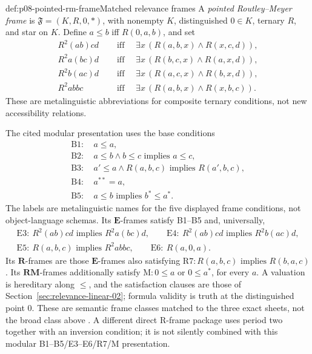 \begin{hbdefinition}{def:p08-pointed-rm-frame}{Matched relevance frames}
A \emph{pointed Routley--Meyer frame} is
\(\mathfrak F=(K,R,0,{*})\), with nonempty \(K\), distinguished
\(0\in K\), ternary \(R\), and star on \(K\).  Define
\(a\leq b\) iff \(R(0,a,b)\), and set
\[
\begin{aligned}
 R^2(ab)cd &\quad\text{ iff }\quad
   \exists x\,(R(a,b,x)\land R(x,c,d)),\\
 R^2a(bc)d &\quad\text{ iff }\quad
   \exists x\,(R(b,c,x)\land R(a,x,d)),\\
 R^2b(ac)d &\quad\text{ iff }\quad
   \exists x\,(R(a,c,x)\land R(b,x,d)),\\
 R^2abbc &\quad\text{ iff }\quad
   \exists x\,(R(a,b,x)\land R(x,b,c)).
\end{aligned}
\]
These are metalinguistic abbreviations for composite ternary conditions, not
new accessibility relations.

The cited modular presentation uses the base conditions
\begin{align*}
 \mathrm{B1}:&\ a\leq a,\\
 \mathrm{B2}:&\ a\leq b\land b\leq c\text{ implies }a\leq c,\\
 \mathrm{B3}:&\ a'\leq a\land R(a,b,c)\text{ implies }R(a',b,c),\\
 \mathrm{B4}:&\ a^{**}=a,\\
 \mathrm{B5}:&\ a\leq b\text{ implies }b^*\leq a^*.
\end{align*}
The labels are metalinguistic names for the five displayed frame conditions,
not object-language schemas.  Its \(\mathbf E\)-frames satisfy
B1--B5 and, universally,
\[
\begin{gathered}
 \mathrm{E3}:\ R^2(ab)cd\text{ implies }R^2a(bc)d,\qquad
 \mathrm{E4}:\ R^2(ab)cd\text{ implies }R^2b(ac)d,\\
 \mathrm{E5}:\ R(a,b,c)\text{ implies }R^2abbc,\qquad
 \mathrm{E6}:\ R(a,0,a).
\end{gathered}
\]
Its \(\mathbf R\)-frames are those \(\mathbf E\)-frames also
satisfying \(\mathrm{R7}: R(a,b,c)\text{ implies }R(b,a,c)\).  Its
\(\mathbf{RM}\)-frames additionally satisfy
\(\mathrm{M}: 0\leq a\) or \(0\leq a^*\), for every \(a\).  A valuation is
hereditary along \(\leq\), and the satisfaction clauses are those of
Section~\ref{sec:relevance-linear-02}; formula validity is truth at the
distinguished point \(0\).  These are semantic frame classes matched to the
three exact sheets, not the broad class above
\cite{RoutleyMeyer1973,DunnRestall2002}.  A different direct R-frame package
uses period two together with an inversion condition; it is not silently
combined with this modular B1--B5/E3--E6/R7/M presentation.
\end{hbdefinition}

